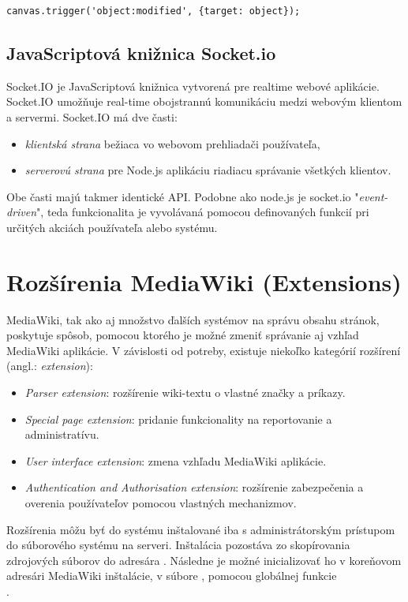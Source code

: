 \begin{lstlisting}[style=web,caption={Manuálne vyvolanie udalosti v knižnici Fabric},captionpos=b, label={lst:fabric-trigger}]
canvas.trigger('object:modified', {target: object});
\end{lstlisting}


\subsection{JavaScriptová knižnica Socket.io}\label{sec:socketio}
Socket.IO je JavaScriptová knižnica vytvorená pre realtime webové aplikácie. Socket.IO umožňuje real-time obojstrannú komunikáciu medzi webovým klientom a servermi. Socket.IO má dve časti:
\begin{itemize}
	\item \textit{klientská strana} bežiaca vo webovom prehliadači používateľa,
	\item \textit{serverovú strana} pre Node.js aplikáciu riadiacu správanie všetkých klientov.
\end{itemize}
Obe časti majú takmer identické API. Podobne ako node.js je socket.io "\textit{event-driven}", teda funkcionalita je vyvolávaná pomocou definovaných funkcií pri určitých akciách používateľa alebo systému.



\section{Rozšírenia MediaWiki (Extensions)}\label{sec:mediaWiki_extensions}
MediaWiki, tak ako aj množstvo ďalších systémov na správu obsahu stránok, poskytuje spôsob, pomocou ktorého je možné zmeniť správanie aj vzhľad MediaWiki aplikácie. V závislosti od potreby, existuje niekoľko kategórií rozšírení (angl.: \textit{extension}):
\begin{itemize}
	\item \textit{Parser extension}: rozšírenie wiki-textu o vlastné značky a príkazy.
	\item \textit{Special page extension}: pridanie funkcionality na reportovanie a administratívu.
	\item \textit{User interface extension}: zmena vzhľadu MediaWiki aplikácie.
	\item \textit{Authentication and Authorisation extension}: rozšírenie zabezpečenia a overenia používateľov pomocou vlastných mechanizmov.
\end{itemize} 

Rozšírenia môžu byť do systému inštalované iba s administrátorským prístupom do súborového systému na serveri. Inštalácia pozostáva zo skopírovania zdrojových súborov do adresára . Následne je možné inicializovať ho v koreňovom adresári MediaWiki inštalácie, v súbore , pomocou globálnej funkcie
\\
.

